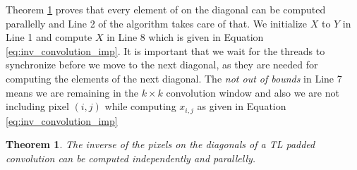 \documentclass[a4paper,twoside]{article}
\newtheorem{theorem}{Theorem}
\theoremstyle{definition}
\begin{document}
Theorem \ref{th:ind_parallel} proves that every element of on the diagonal can be computed parallelly and Line 2 of the algorithm takes care of that. We initialize $X$ to $Y$ in Line 1 and compute $X$ in Line 8 which is given in Equation \ref{eq:inv_convolution_imp}. 
It is important that we wait for the threads to synchronize before we move to the next diagonal, as they are needed for computing the elements of the next diagonal. The \emph{not out of bounds} in Line 7 means we are remaining in the $k \times k$ convolution window and also we are not including pixel $(i, j)$ while computing $x_{i, j}$ as given in Equation \ref{eq:inv_convolution_imp}


\begin{theorem}
\label{th:ind_parallel}
The inverse of the pixels on the diagonals of a TL padded convolution can be computed independently and parallelly.
\end{theorem}
\end{document}
